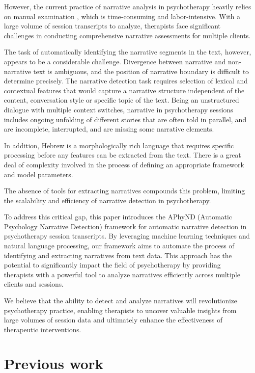 \documentclass[preprint,12pt]{elsarticle}
\begin{document}
However, the current practice of narrative analysis in psychotherapy heavily relies on manual examination \cite{angus1994narrative,gonccalves2010innovative,botella2011narrative}, which is time-consuming and labor-intensive. With a large volume of session transcripts to analyze, therapists face significant challenges in conducting comprehensive narrative assessments for multiple clients. 

The task of automatically identifying the narrative segments in the text, however, appears to be a considerable challenge. Divergence between narrative and non-narrative text is ambiguous, and the position of narrative boundary is difficult to determine precisely. The narrative detection task requires selection of lexical and contextual features that would capture a narrative structure independent of the content, conversation style or specific topic of the text. Being an unstructured dialogue with multiple context switches, narrative in psychotherapy sessions includes ongoing unfolding of different stories that are often told in parallel, and are incomplete, interrupted, and are missing some narrative elements.

In addition, Hebrew is a morphologically rich language that requires specific processing before any features can be extracted from the text. There is a great deal of complexity involved in the process of defining an appropriate framework and model parameters.

The absence of tools for extracting narratives compounds this problem, limiting the scalability and efficiency of narrative detection in psychotherapy.

To address this critical gap, this paper introduces the APhyND (Automatic Psychology Narrative Detection) framework for automatic narrative detection in psychotherapy session transcripts. By leveraging machine learning techniques and natural language processing, our framework aims to automate the process of identifying and extracting narratives from text data. This approach has the potential to significantly impact the field of psychotherapy by providing therapists with a powerful tool to analyze narratives efficiently across multiple clients and sessions.

We believe that the ability to detect and analyze narratives will revolutionize psychotherapy practice, enabling therapists to uncover valuable insights from large volumes of session data and ultimately enhance the effectiveness of therapeutic interventions.

\section{Previous work}
\end{document}
